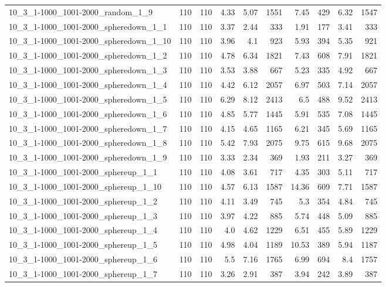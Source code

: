 \begin{center}
\begin{scriptsize}
\begin{longtable}{lrrrrrrrrr}
10\_3\_1-1000\_1001-2000\_random\_1\_9 & 110 & 110 & 4.33 & 5.07 & 1551 & 7.45 & 429 & 6.32 & 1547\\
10\_3\_1-1000\_1001-2000\_spheredown\_1\_1 & 110 & 110 & 3.37 & 2.44 & 333 & 1.91 & 177 & 3.41 & 333\\
10\_3\_1-1000\_1001-2000\_spheredown\_1\_10 & 110 & 110 & 3.96 & 4.1 & 923 & 5.93 & 394 & 5.35 & 921\\
10\_3\_1-1000\_1001-2000\_spheredown\_1\_2 & 110 & 110 & 4.78 & 6.34 & 1821 & 7.43 & 608 & 7.91 & 1821\\
10\_3\_1-1000\_1001-2000\_spheredown\_1\_3 & 110 & 110 & 3.53 & 3.88 & 667 & 5.23 & 335 & 4.92 & 667\\
10\_3\_1-1000\_1001-2000\_spheredown\_1\_4 & 110 & 110 & 4.42 & 6.12 & 2057 & 6.97 & 503 & 7.14 & 2057\\
10\_3\_1-1000\_1001-2000\_spheredown\_1\_5 & 110 & 110 & 6.29 & 8.12 & 2413 & 6.5 & 488 & 9.52 & 2413\\
10\_3\_1-1000\_1001-2000\_spheredown\_1\_6 & 110 & 110 & 4.85 & 5.77 & 1445 & 5.91 & 535 & 7.08 & 1445\\
10\_3\_1-1000\_1001-2000\_spheredown\_1\_7 & 110 & 110 & 4.15 & 4.65 & 1165 & 6.21 & 345 & 5.69 & 1165\\
10\_3\_1-1000\_1001-2000\_spheredown\_1\_8 & 110 & 110 & 5.42 & 7.93 & 2075 & 9.75 & 615 & 9.68 & 2075\\
10\_3\_1-1000\_1001-2000\_spheredown\_1\_9 & 110 & 110 & 3.33 & 2.34 & 369 & 1.93 & 211 & 3.27 & 369\\
10\_3\_1-1000\_1001-2000\_sphereup\_1\_1 & 110 & 110 & 4.08 & 3.61 & 717 & 4.35 & 303 & 5.11 & 717\\
10\_3\_1-1000\_1001-2000\_sphereup\_1\_10 & 110 & 110 & 4.57 & 6.13 & 1587 & 14.36 & 609 & 7.71 & 1587\\
10\_3\_1-1000\_1001-2000\_sphereup\_1\_2 & 110 & 110 & 4.11 & 3.49 & 745 & 5.3 & 354 & 4.84 & 745\\
10\_3\_1-1000\_1001-2000\_sphereup\_1\_3 & 110 & 110 & 3.97 & 4.22 & 885 & 5.74 & 448 & 5.09 & 885\\
10\_3\_1-1000\_1001-2000\_sphereup\_1\_4 & 110 & 110 & 4.0 & 4.62 & 1229 & 6.51 & 455 & 5.89 & 1229\\
10\_3\_1-1000\_1001-2000\_sphereup\_1\_5 & 110 & 110 & 4.98 & 4.04 & 1189 & 10.53 & 389 & 5.94 & 1187\\
10\_3\_1-1000\_1001-2000\_sphereup\_1\_6 & 110 & 110 & 5.5 & 7.16 & 1765 & 6.99 & 694 & 8.4 & 1757\\
10\_3\_1-1000\_1001-2000\_sphereup\_1\_7 & 110 & 110 & 3.26 & 2.91 & 387 & 3.94 & 242 & 3.89 & 387\\

\end{longtable}
\end{scriptsize}
\end{center}
